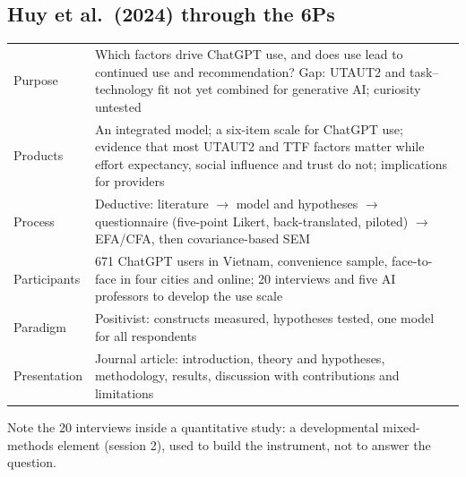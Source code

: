\documentclass[11pt,a4paper,british,twoside=false,headings=small,chapterprefix=false,numbers=noenddot]{scrbook}
\begin{document}
\subsection{Huy et al.\ (2024) through the 6Ps}
\begin{center}\small
\small
  \renewcommand{\arraystretch}{1.12}
  \begin{tabular}{@{}p{2.4cm}p{10.9cm}@{}}
    \toprule
    Purpose       & Which factors drive ChatGPT use, and does use lead to continued use and recommendation? Gap: UTAUT2 and task--technology fit not yet combined for generative AI; curiosity untested\\
    Products      & An integrated model; a six-item scale for ChatGPT use; evidence that most UTAUT2 and TTF factors matter while effort expectancy, social influence and trust do not; implications for providers\\
    Process       & Deductive: literature $\rightarrow$ model and hypotheses $\rightarrow$ questionnaire (five-point Likert, back-translated, piloted) $\rightarrow$ EFA/CFA, then covariance-based SEM\\
    Participants  & 671 ChatGPT users in Vietnam, convenience sample, face-to-face in four cities and online; 20 interviews and five AI professors to develop the use scale\\
    Paradigm      & Positivist: constructs measured, hypotheses tested, one model for all respondents\\
    Presentation  & Journal article: introduction, theory and hypotheses, methodology, results, discussion with contributions and limitations\\
    \bottomrule
  \end{tabular}
  

  Note the 20 interviews inside a quantitative study: a developmental
  mixed-methods element (session 2), used to build the instrument, not to
  answer the question.
\end{center}
\end{document}
